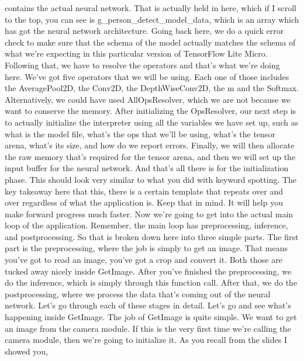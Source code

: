     contains the actual neural network.
    That is actually held in here, which if I scroll to the top, you can see
    is g\_person\_detect\_model\_data, which is an array which has
    got the neural network architecture.
    Going back here, we do a quick error check
    to make sure that the schema of the model
    actually matches the schema of what we're
    expecting in this particular version of TensorFlow Lite Micro.
    Following that, we have to resolve the operators
    and that's what we're doing here.
    We've got five operators that we will be using.
    Each one of those includes the AveragePool2D, the Conv2D,
    the DepthWiseConv2D, the m and the Softmax.
    Alternatively, we could have used AllOpsResolver, which we are not
    because we want to conserve the memory.
    After initializing the OpsResolver, our next step
    is to actually initialize the interpreter using all the variables we
    have set up, such as what is the model file, what's the ops that we'll
    be using, what's the tensor arena, what's its size,
    and how do we report errors.
    Finally, we will then allocate the raw memory that's
    required for the tensor arena, and then we
    will set up the input buffer for the neural network.
    And that's all there is for the initialization phase.
    This should look very similar to what you did with keyword spotting.
    The key takeaway here that this, there is a certain template that repeats over
    and over regardless of what the application is.
    Keep that in mind.
    It will help you make forward progress much faster.
    Now we're going to get into the actual main loop of the application.
    Remember, the main loop has preprocessing, inference,
    and postprocessing.
    So that is broken down here into three simple parts.
    The first part is the preprocessing, where
    the job is simply to get an image.
    That means you've got to read an image, you've got a crop and convert it.
    Both those are tucked away nicely inside GetImage.
    After you've finished the preprocessing, we
    do the inference, which is simply through this function call.
    After that, we do the postprocessing, where
    we process the data that's coming out of the neural network.
    Let's go through each of these stages in detail.
    Let's go and see what's happening inside GetImage.
    The job of GetImage is quite simple.
    We want to get an image from the camera module.
    If this is the very first time we're calling the camera module,
    then we're going to initialize it.
    As you recall from the slides I showed you,
